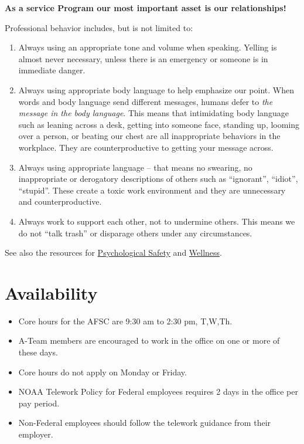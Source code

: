 \documentclass[
  letterpaper,
  DIV=11,
  numbers=noendperiod]{scrreprt}
\providecommand{\tightlist}{%
  \setlength{\itemsep}{0pt}\setlength{\parskip}{0pt}}\usepackage{longtable,booktabs,array}
\begin{document}
\textbf{As a service Program our most important asset is our
relationships!}

Professional behavior includes, but is not limited to:

\begin{enumerate}
\def\labelenumi{\arabic{enumi}.}
\tightlist
\item
  Always using an appropriate tone and volume when speaking. Yelling is
  almost never necessary, unless there is an emergency or someone is in
  immediate danger.\\
\item
  Always using appropriate body language to help emphasize our point.
  When words and body language send different messages, humans defer to
  \emph{the message in the body language}. This means that intimidating
  body language such as leaning across a desk, getting into someone
  face, standing up, looming over a person, or beating our chest are all
  inappropriate behaviors in the workplace. They are counterproductive
  to getting your message across.\\
\item
  Always using appropriate language -- that means no swearing, no
  inappropriate or derogatory descriptions of others such as
  ``ignorant'', ``idiot'', ``stupid''. These create a toxic work
  environment and they are unnecessary and counterproductive.\\
\item
  Always work to support each other, not to undermine others. This means
  we do not ``talk trash'' or disparage others under any circumstances.
\end{enumerate}

See also the resources for \hyperref[psych-safety]{Psychological Safety}
and \href{wellness-resources.qmd}{Wellness}.

\section{Availability}\label{availability}

\begin{itemize}
\tightlist
\item
  Core hours for the AFSC are 9:30 am to 2:30 pm, T,W,Th.\\
\item
  A-Team members are encouraged to work in the office on one or more of
  these days.\\
\item
  Core hours do not apply on Monday or Friday.\\
\item
  NOAA Telework Policy for Federal employees requires 2 days in the
  office per pay period.\\
\item
  Non-Federal employees should follow the telework guidance from their
  employer.
\end{itemize}
\end{document}
